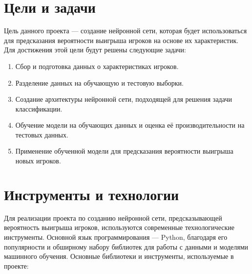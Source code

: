 \documentclass[12pt,a4paper]{article}
\begin{document}
\section{Цели и задачи}
Цель данного проекта — создание нейронной сети, которая будет использоваться для предсказания вероятности выигрыша игроков на основе их характеристик. Для достижения этой цели будут решены следующие задачи:
\begin{enumerate}
    \item Сбор и подготовка данных о характеристиках игроков.
    \item Разделение данных на обучающую и тестовую выборки.
    \item Создание архитектуры нейронной сети, подходящей для решения задачи классификации.
    \item Обучение модели на обучающих данных и оценка её производительности на тестовых данных.
    \item Применение обученной модели для предсказания вероятности выигрыша новых игроков.
\end{enumerate}
\section{Инструменты и технологии}

Для реализации проекта по созданию нейронной сети, предсказывающей вероятность выигрыша игроков, используются современные технологические инструменты. Основной язык программирования — Python, благодаря его популярности и обширному набору библиотек для работы с данными и моделями машинного обучения.
Основные библиотеки и инструменты, используемые в проекте:
\end{document}
